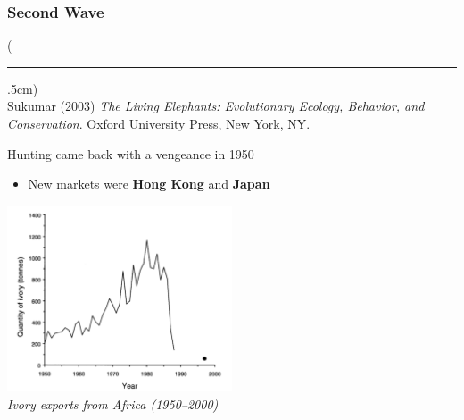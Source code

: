 \documentclass[10pt]{beamer}
\newenvironment{reference}[2]{%
	\begin{textblock*}{\textwidth}(#1,#2)
		\tiny\bgroup\color{gray}}{\egroup\end{textblock*}}
\begin{document}
\begin{frame}[t]
\frametitle{Second Wave}
\vspace{0.5cm}

	\begin{reference}{4mm}{90mm}
		\rule{1.5cm}{0.25pt}\\
		Sukumar (2003) \emph{The Living Elephants: Evolutionary Ecology, Behavior, and Conservation}. Oxford University Press, New York, NY.
	\end{reference}
	
	Hunting came back with a vengeance in 1950\\
		\medskip
		\begin{itemize}
			\item New markets were \textbf{Hong Kong} and \textbf{Japan}
		\end{itemize}

	\vspace{0.5cm}
	
	\begin{center}
		\includegraphics[width=0.50\textwidth]{figures/1950_exports.png}\\
				\emph{\footnotesize{Ivory exports from Africa (1950--2000)}}
	\end{center}
\end{frame}
\end{document}

